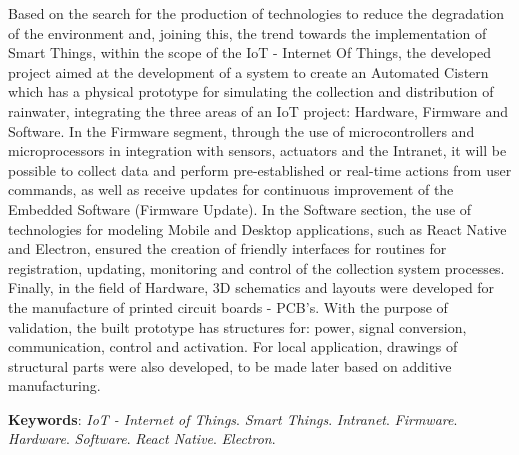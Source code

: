 
\begin{resumo}[ABSTRACT]
\begin{SingleSpacing}


Based on the search for the production of technologies to reduce the degradation of the environment and, joining this, the trend towards the implementation of Smart Things, within the scope of the IoT - Internet Of Things, the developed project aimed at the development of a system to create an Automated Cistern which has a physical prototype for simulating the collection and distribution of rainwater, integrating the three areas of an IoT project: Hardware, Firmware and Software. In the Firmware segment, through the use of microcontrollers and microprocessors in integration with sensors, actuators and the Intranet, it will be possible to collect data and perform pre-established or real-time actions from user commands, as well as receive updates for continuous improvement of the Embedded Software (Firmware Update). In the Software section, the use of technologies for modeling Mobile and Desktop applications, such as React Native and Electron, ensured the creation of friendly interfaces for routines for registration, updating, monitoring and control of the collection system processes. Finally, in the field of Hardware, 3D schematics and layouts were developed for the manufacture of printed circuit boards - PCB's. With the purpose of validation, the built prototype has structures for: power, signal conversion, communication, control and activation. For local application, drawings of structural parts were also developed, to be made later based on additive manufacturing.

\vspace{\onelineskip}

\textbf{Keywords}: \textit{IoT - Internet of Things}. \textit{Smart Things}. \textit{Intranet}.   \textit{Firmware}. \textit{Hardware}. \textit{Software}. \textit{React Native}. \textit{Electron}.

\end{SingleSpacing}
\end{resumo}

